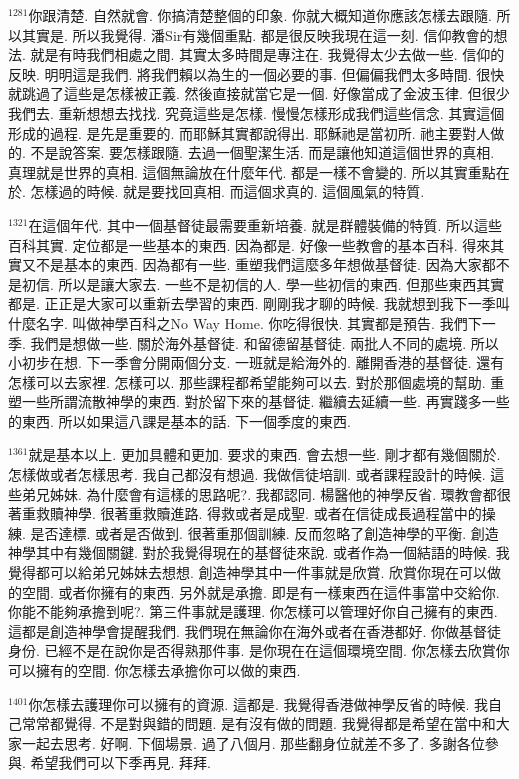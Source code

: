 \documentclass{book}
\begin{document}
$^{1281}$你跟清楚.
自然就會.
你搞清楚整個的印象.
你就大概知道你應該怎樣去跟隨.
所以其實是.
所以我覺得.
潘Sir有幾個重點.
都是很反映我現在這一刻.
信仰教會的想法.
就是有時我們相處之間.
其實太多時間是專注在.
我覺得太少去做一些.
信仰的反映.
明明這是我們.
將我們賴以為生的一個必要的事.
但偏偏我們太多時間.
很快就跳過了這些是怎樣被正義.
然後直接就當它是一個.
好像當成了金波玉律.
但很少我們去.
重新想想去找找.
究竟這些是怎樣.
慢慢怎樣形成我們這些信念.
其實這個形成的過程.
是先是重要的.
而耶穌其實都說得出.
耶穌祂是當初所.
祂主要對人做的.
不是說答案.
要怎樣跟隨.
去過一個聖潔生活.
而是讓他知道這個世界的真相.
真理就是世界的真相.
這個無論放在什麼年代.
都是一樣不會變的.
所以其實重點在於.
怎樣過的時候.
就是要找回真相.
而這個求真的.
這個風氣的特質.

$^{1321}$在這個年代.
其中一個基督徒最需要重新培養.
就是群體裝備的特質.
所以這些百科其實.
定位都是一些基本的東西.
因為都是.
好像一些教會的基本百科.
得來其實又不是基本的東西.
因為都有一些.
重塑我們這麼多年想做基督徒.
因為大家都不是初信.
所以是讓大家去.
一些不是初信的人.
學一些初信的東西.
但那些東西其實都是.
正正是大家可以重新去學習的東西.
剛剛我才聊的時候.
我就想到我下一季叫什麼名字.
叫做神學百科之No Way Home.
你吃得很快.
其實都是預告.
我們下一季.
我們是想做一些.
關於海外基督徒.
和留德留基督徒.
兩批人不同的處境.
所以小初步在想.
下一季會分開兩個分支.
一班就是給海外的.
離開香港的基督徒.
還有怎樣可以去家裡.
怎樣可以.
那些課程都希望能夠可以去.
對於那個處境的幫助.
重塑一些所謂流散神學的東西.
對於留下來的基督徒.
繼續去延續一些.
再實踐多一些的東西.
所以如果這八課是基本的話.
下一個季度的東西.

$^{1361}$就是基本以上.
更加具體和更加.
要求的東西.
會去想一些.
剛才都有幾個關於.
怎樣做或者怎樣思考.
我自己都沒有想過.
我做信徒培訓.
或者課程設計的時候.
這些弟兄姊妹.
為什麼會有這樣的思路呢?.
我都認同.
楊醫他的神學反省.
環教會都很著重救贖神學.
很著重救贖進路.
得救或者是成聖.
或者在信徒成長過程當中的操練.
是否達標.
或者是否做到.
很著重那個訓練.
反而忽略了創造神學的平衡.
創造神學其中有幾個關鍵.
對於我覺得現在的基督徒來說.
或者作為一個結語的時候.
我覺得都可以給弟兄姊妹去想想.
創造神學其中一件事就是欣賞.
欣賞你現在可以做的空間.
或者你擁有的東西.
另外就是承擔.
即是有一樣東西在這件事當中交給你.
你能不能夠承擔到呢?.
第三件事就是護理.
你怎樣可以管理好你自己擁有的東西.
這都是創造神學會提醒我們.
我們現在無論你在海外或者在香港都好.
你做基督徒身份.
已經不是在說你是否得熟那件事.
是你現在在這個環境空間.
你怎樣去欣賞你可以擁有的空間.
你怎樣去承擔你可以做的東西.

$^{1401}$你怎樣去護理你可以擁有的資源.
這都是.
我覺得香港做神學反省的時候.
我自己常常都覺得.
不是對與錯的問題.
是有沒有做的問題.
我覺得都是希望在當中和大家一起去思考.
好啊.
下個場景.
過了八個月.
那些翻身位就差不多了.
多謝各位參與.
希望我們可以下季再見.
拜拜.
\newpage
\end{document}
